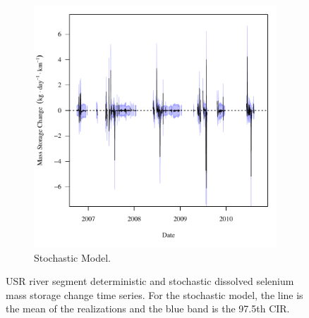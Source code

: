 \begin{linenumbers}
\begin{landscape}
\begin{figure}
\begin{subfigure}{0.7\textwidth}
			\includegraphics[width=\tableCustomSize]{"Figures/Results_DSR/Stochastic/f Segment F"}
			\caption{Stochastic Model.}
		\end{subfigure}
		\caption[USR river segment deterministic and stochastic dissolved selenium mass storage change time series.]{USR river segment deterministic and stochastic dissolved selenium mass storage change time series.  For the stochastic model, the line is the mean of the realizations and the blue band is the 97.5th CIR.}
		\label{fig:massSegmentStoreChange_DSR}
	\end{figure}
\end{landscape}


\end{linenumbers}
